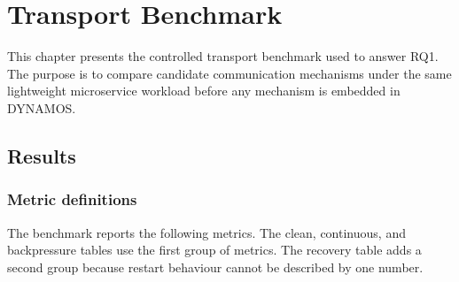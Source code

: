 \chapter{Transport Benchmark}\label{ch:transport-benchmark}

This chapter presents the controlled transport benchmark used to answer RQ1. The purpose is to compare candidate communication mechanisms under the same lightweight microservice workload before any mechanism is embedded in DYNAMOS.

\section{Results}\label{sec:rq1}

\subsection{Metric definitions}

The benchmark reports the following metrics. The clean, continuous, and backpressure tables use the first group of metrics. The recovery table adds a second group because restart behaviour cannot be described by one number.

